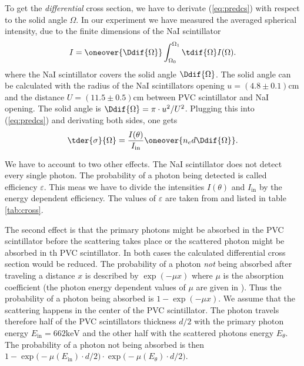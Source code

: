 To get the \emph{differential} cross section, we have to derivate
(\ref{eq:predcs}) with respect to the solid angle $\Omega$. In our experiment we have measured the averaged
spherical intensity, due to the finite dimensions of the NaI scintillator
\begin{align}
  I = \oneover{\Ddif{\Omega}} \int_{\Omega_0}^{\Omega_1} \tdif{\Omega} I(\Omega).
\end{align}
where the NaI scintillator covers the solid angle $\Ddif{\Omega}$. The
solid angle can be calculated with the radius of the NaI scintillators
opening $u=(4.8\pm0.1) \mathrm{cm}$ and the distance $U=(11.5\pm0.5) \mathrm{cm}$ between PVC scintillator and
NaI opening. The solid angle is $\Ddif{\Omega} = \pi \cdot u^2/U^2$.
Plugging this into (\ref{eq:predcs}) and derivating both sides, one gets
\begin{align}
  \tder{\sigma}{\Omega} = \frac{I(\theta)}{I_{\mathrm{in}}} \oneover{n_e d
  \Ddif{\Omega}}.
  \label{eq:predcs2}
\end{align}

We have to account to two other effects. The NaI scintillator does not detect
every single photon. The probability of a photon being detected is called
efficiency $\varepsilon$.  This meas we have to divide the intensities
$I(\theta)$ and $I_{\mathrm{in}}$ by the energy dependent efficiency. The
values of $\varepsilon$ are taken from \cite{fluegge} and listed in table
\ref{tab:cross}.

The second effect is that the primary photons might be absorbed in the PVC
scintillator before the scattering takes place or the scattered photon might
be absorbed in th PVC scintillator. In both cases the calculated
differential cross section would be reduced. The probability of a photon
\emph{not}
being absorbed after traveling a distance $x$ is described by $\exp(-\mu x)$
where $\mu$ is the absorption coefficient (the photon energy dependent
values of $\mu$ are given in \cite{anleitung}). Thus the probability of a photon
being absorbed is $1-\exp(-\mu x)$. We assume that the scattering
happens in the center of the PVC scintillator. The photon travels therefore
half of the PVC scintillators thickness $d/2$ with the primary photon energy
$E_{\mathrm{in}}=662 \mathrm{keV}$ and the other half with the scattered photons energy
$E_\theta$. The probability of a photon not being absorbed is then
$1-\exp\big(-\mu(E_{\mathrm{in}}) \cdot d/2\big) \cdot \exp\big(-\mu(E_\theta) \cdot d/2\big)$.

